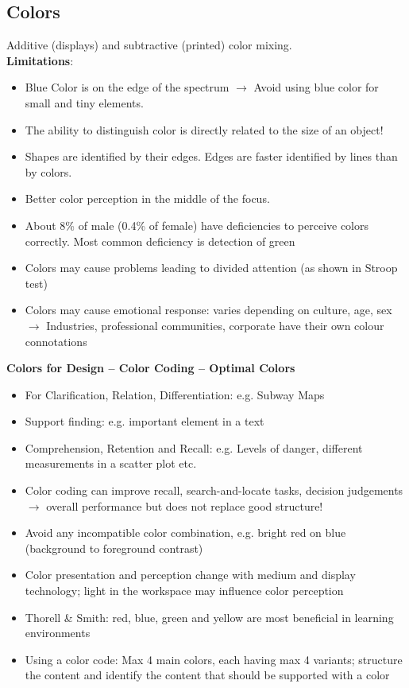 \subsection{Colors}
Additive (displays) and subtractive (printed) color mixing.\\
\textbf{Limitations}: 
\begin{itemize}
\item Blue Color is on the edge of the spectrum $\rightarrow$ Avoid using blue color for small and tiny elements.
\item The ability to distinguish color is directly related to the size of an object!
\item Shapes are identified by their edges. Edges are faster identified by lines than by colors.
\item Better color perception in the middle of the focus.
\item About 8\% of male (0.4\% of female) have deficiencies to perceive colors correctly. Most common deficiency is detection of green
\item Colors may cause problems leading to divided attention (as shown in Stroop test)
\item Colors may cause emotional response: varies depending on culture, age, sex $\rightarrow$ Industries, professional communities, corporate have their own colour connotations
\end{itemize}
\textbf{Colors for Design -- Color Coding -- Optimal Colors}
\begin{itemize}
\item For Clarification, Relation, Differentiation: e.g. Subway Maps
\item Support finding: e.g. important element in a text
\item Comprehension, Retention and Recall: e.g. Levels of danger, different measurements in a scatter plot etc.
\item Color coding can improve recall, search-and-locate tasks, decision judgements $\rightarrow$ overall performance but does not replace good structure!
\item Avoid any incompatible color combination, e.g. bright red on blue (background to foreground contrast)
\item Color presentation and perception change with medium and display technology; light in the workspace may influence color perception
\item Thorell \& Smith: red, blue, green and yellow are most beneficial in learning environments
\item Using a color code: Max 4 main colors, each having max 4 variants; structure the content and identify the content that should be supported with a color
\end{itemize}
